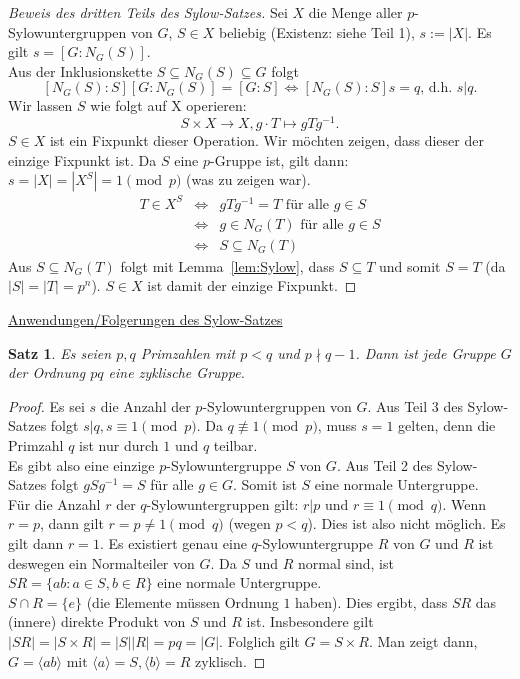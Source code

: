 \documentclass[12pt]{scrartcl} %
\newtheorem{thm}{Satz}
\theoremstyle{definition}
\theoremstyle{remark}
\begin{document}
\begin{proof}[Beweis des dritten Teils des Sylow-Satzes]
	Sei $X$ die Menge aller $p$-Sylowuntergruppen von $G$, $S \in X$ beliebig (Existenz: siehe Teil 1), $s := |X|$. Es gilt $s = [G:N_G(S)]$. \\
	Aus der Inklusionskette $S \subseteq N_G(S) \subseteq G$ folgt
	$$[N_G(S):S] [G:N_G(S)] = [G:S] \Leftrightarrow [N_G(S):S] s = q \text{, d.h. } s | q.$$
	Wir lassen $S$ wie folgt auf X operieren:
	$$S \times X \rightarrow X, g \cdot T \mapsto gTg^{-1}.$$
	$S \in X$ ist ein Fixpunkt dieser Operation. Wir möchten zeigen, dass dieser der einzige Fixpunkt ist. Da $S$ eine $p$-Gruppe ist, gilt dann: $s = |X| = |X^S| = 1 \pmod{p}$ (was zu zeigen war).
	\begin{align*}
		T \in X^S &\Leftrightarrow &gTg^{-1} = T \text{ für alle } g \in S \\
		&\Leftrightarrow &g \in N_G(T) \text{ für alle } g \in S \\
		&\Leftrightarrow &S \subseteq N_G(T)
	\end{align*}
	Aus $S \subseteq N_G(T)$ folgt mit Lemma~\ref{lem:Sylow}, dass $S \subseteq T$ und somit $S = T$ (da $|S| = |T| = p^n$). $S \in X$ ist damit der einzige Fixpunkt.
\end{proof}

\underline{Anwendungen/Folgerungen des Sylow-Satzes}

\begin{thm}
	Es seien $p, q$ Primzahlen mit $p < q$ und $p \nmid q-1$. Dann ist jede Gruppe $G$ der Ordnung $pq$ eine zyklische Gruppe.
\end{thm}

\begin{proof}
	Es sei $s$ die Anzahl der $p$-Sylowuntergruppen von $G$. Aus Teil 3 des Sylow-Satzes folgt $s | q, s \equiv 1 \pmod{p}$. Da $q \not \equiv 1 \pmod{p}$, muss $s = 1$ gelten, denn die Primzahl $q$ ist nur durch $1$ und $q$ teilbar. \\
	Es gibt also eine einzige $p$-Sylowuntergruppe $S$ von $G$. Aus Teil 2 des Sylow-Satzes folgt $gSg^{-1} = S$ für alle $g \in G$. Somit ist $S$ eine normale Untergruppe. \\
	Für die Anzahl $r$ der $q$-Sylowuntergruppen gilt: $r | p$ und $r \equiv 1 \pmod{q}$. Wenn $r = p$, dann gilt $r = p \not = 1 \pmod{q}$ (wegen $p < q$). Dies ist also nicht möglich. Es gilt dann $r = 1$. Es existiert genau eine $q$-Sylowuntergruppe $R$ von $G$ und $R$ ist deswegen ein Normalteiler von $G$. Da $S$ und $R$ normal sind, ist $SR = \{ ab : a \in S, b \in R\}$ eine normale Untergruppe. \\
	$S \cap R = \{ e\}$ (die Elemente müssen Ordnung $1$ haben). Dies ergibt, dass $SR$ das (innere) direkte Produkt von $S$ und $R$ ist. Insbesondere gilt $|SR| = |S \times R| = |S||R| = pq = |G|$. Folglich gilt $G = S \times R$. Man zeigt dann, $G = \langle ab \rangle \text{ mit } \langle a \rangle = S, \langle b \rangle = R$ zyklisch.
\end{proof}
\end{document}
